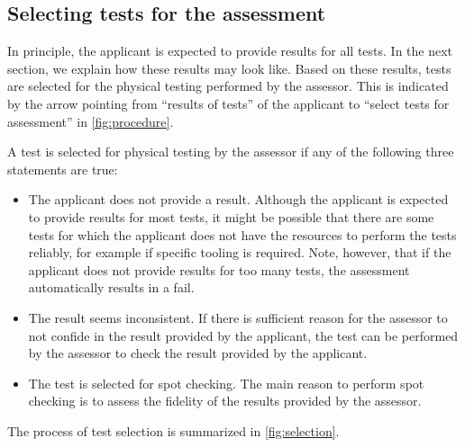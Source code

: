 \subsection{Selecting tests for the assessment}
\label{sec:selection}

In principle, the applicant is expected to provide results for all tests. In the next section, we explain how these results may look like. Based on these results, tests are selected for the physical testing performed by the assessor. This is indicated by the arrow pointing from ``results of tests'' of the applicant to ``select tests for assessment'' in \cref{fig:procedure}.  

A test is selected for physical testing by the assessor if any of the following three statements are true:
\begin{itemize}
	\item The applicant does not provide a result. Although the applicant is expected to provide results for most tests, it might be possible that there are some tests for which the applicant does not have the resources to perform the tests reliably, for example if specific tooling is required. Note, however, that if the applicant does not provide results for too many tests, the assessment automatically results in a fail.
	\item The result seems inconsistent. If there is sufficient reason for the assessor to not confide in the result provided by the applicant, the test can be performed by the assessor to check the result provided by the applicant.
	\item The test is selected for spot checking. The main reason to perform spot checking is to assess the fidelity of the results provided by the assessor.
\end{itemize}
The process of test selection is summarized in \cref{fig:selection}.

